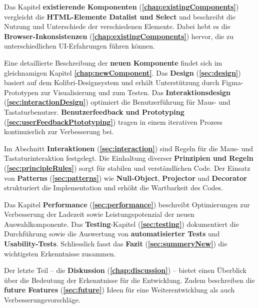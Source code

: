 Das Kapitel \textbf{existierende Komponenten} (\textbf{\ref{chap:existingComponents}}) vergleicht die \textbf{HTML-Elemente Datalist und Select} und beschreibt die Nutzung und Unterschiede der verschiedenen Elemente. 
Dabei hebt es die \textbf{Browser-Inkonsistenzen} (\textbf{\ref{chap:existingComponents}}) hervor, die zu unterschiedlichen UI-Erfahrungen führen können.

Eine detaillierte Beschreibung der \textbf{neuen Komponente} findet sich im gleichnamigen Kapitel \textbf{\ref{chap:newComponent}}.
Das \textbf{Design} (\textbf{\ref{sec:design}}) basiert auf dem Kolibri-Designsystem und erhält Unterstützung durch Figma-Prototypen zur Visualisierung und zum Testen.
Das \textbf{Interaktionsdesign} (\textbf{\ref{sec:interactionDesign}}) optimiert die Benutzerführung für Maus- und Tastaturbenutzer.
\textbf{Benutzerfeedback und Prototyping} (\textbf{\ref{sec:userFeedbackPtototyping}}) tragen in einem iterativen Prozess kontinuierlich zur Verbesserung bei.

Im Abschnitt \textbf{Interaktionen} (\textbf{\ref{sec:interaction}}) sind Regeln für die Maus- und Tastaturinteraktion festgelegt.
Die Einhaltung diverser \textbf{Prinzipien und Regeln} (\textbf{\ref{sec:principleRules}}) sorgt für stabilen und verständlichen Code.
Der Einsatz von \textbf{Patterns} (\textbf{\ref{sec:patterns}}) wie \textbf{Null-Object}, \textbf{Projector} und \textbf{Decorator} strukturiert die Implementation und erhöht die Wartbarkeit des Codes.

Das Kapitel \textbf{Performance} (\textbf{\ref{sec:performance}}) beschreibt Optimierungen zur Verbesserung der Ladezeit sowie Leistungspotenzial der neuen Auswahlkomponente.
Das \textbf{Testing}-Kapitel (\textbf{\ref{sec:testing}}) dokumentiert die Durchführung sowie die Auswertung von \textbf{automatisierter Tests} und \textbf{Usability-Tests}.
Schliesslich fasst das \textbf{Fazit} (\textbf{\ref{sec:summeryNew}}) die wichtigsten Erkenntnisse zusammen.

Der letzte Teil – die \textbf{Diskussion} (\textbf{\ref{chap:discussion}}) – bietet einen Überblick über die Bedeutung der Erkenntnisse für die Entwicklung.
Zudem beschreiben die \textbf{future Features} (\textbf{\ref{sec:future}}) Ideen für eine Weiterentwicklung als auch Verbesserungsvorschläge.
